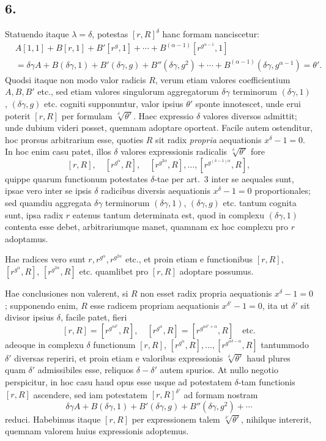 \documentclass[12pt]{article}
\begin{document}
\subsection*{6.}

Statuendo itaque $\lambda=\delta$, potestas $[r,R]^\delta$ hanc formam nanciscetur:
\[
\begin{aligned}
&A[1,1]+B[r,1]+B'[r^g,1]+\cdots+B^{(\alpha-1)}[r^{g^{\alpha-1}},1]\\
&=\delta\gamma A+B(\delta\gamma,1)+B'(\delta\gamma,g)+B''(\delta\gamma,g^2)+\cdots+
B^{(\alpha-1)}(\delta\gamma,g^{\alpha-1})=\theta'.
\end{aligned}
\]
Quodsi itaque non modo valor radicis $R$, verum etiam valores coefficientium $A,B,B'$ etc., sed etiam valores singulorum aggregatorum $\delta\gamma$ terminorum $(\delta\gamma,1)$, $(\delta\gamma,g)$ etc. cogniti supponuntur, valor ipsius $\theta'$ sponte innotescet, unde erui poterit $[r,R]$ per formulam $\sqrt[\delta]{\theta'}$. Haec expressio $\delta$ valores diversos admittit; unde dubium videri posset, quemnam adoptare oporteat. Facile autem ostenditur, hoc prorsus arbitrarium esse, quoties $R$ sit radix \emph{propria} aequationis $x^\delta-1=0$. In hoc enim casu patet, illos $\delta$ valores expressionis radicalis $\sqrt[\delta]{\theta'}$ fore
\[
[r,R],\quad [r^{g^\alpha},R],\quad [r^{g^{2\alpha}},R],\ldots,
[r^{g^{(\delta-1)\alpha}},R],
\]
quippe quarum functionum potestates $\delta$-tae per art.~3 inter se aequales sunt, ipsae vero inter se ipsis $\delta$ radicibus diversis aequationis $x^\delta-1=0$ proportionales; sed quamdiu aggregata $\delta\gamma$ terminorum $(\delta\gamma,1)$, $(\delta\gamma,g)$ etc. tantum cognita sunt, ipsa radix $r$ eatenus tantum determinata est, quod in complexu $(\delta\gamma,1)$ contenta esse debet, arbitrariumque manet, quamnam ex hoc complexu pro $r$ adoptamus.

Hae radices vero sunt $r,r^{g^\alpha},r^{g^{2\alpha}}$ etc., et proin etiam e functionibus $[r,R]$, $[r^{g^\alpha},R]$, $[r^{g^{2\alpha}},R]$ etc. quamlibet pro $[r,R]$ adoptare possumus.

Hae conclusiones non valerent, si $R$ non esset radix propria aequationis $x^\delta-1=0$; supponendo enim, $R$ esse radicem propriam aequationis $x^{\delta'}-1=0$, ita ut $\delta'$ sit divisor ipsius $\delta$, facile patet, fieri
\[
[r,R]=[r^{g^{\alpha\delta'}},R],\quad [r^{g^\alpha},R]=[r^{g^{\alpha\delta'+\alpha}},R]\quad \text{etc.}
\]
adeoque in complexu $\delta$ functionum $[r,R]$, $[r^{g^\alpha},R],\ldots,[r^{g^{\alpha\delta-\alpha}},R]$ tantummodo $\delta'$ diversas reperiri, et proin etiam e valoribus expressionis $\sqrt[\delta]{\theta'}$ haud plures quam $\delta'$ admissibiles esse, reliquos $\delta-\delta'$ autem spurios. At nullo negotio perspicitur, in hoc casu haud opus esse usque ad potestatem $\delta$-tam functionis $[r,R]$ ascendere, sed iam potestatem $[r,R]^{\delta'}$ ad formam nostram
\[
\delta\gamma A+B(\delta\gamma,1)+B'(\delta\gamma,g)+B''(\delta\gamma,g^2)+\cdots
\]
reduci. Habebimus itaque $[r,R]$ per expressionem talem $\sqrt[\delta']{\theta'}$, nihilque intererit, quemnam valorem huius expressionis adoptemus.
\end{document}
